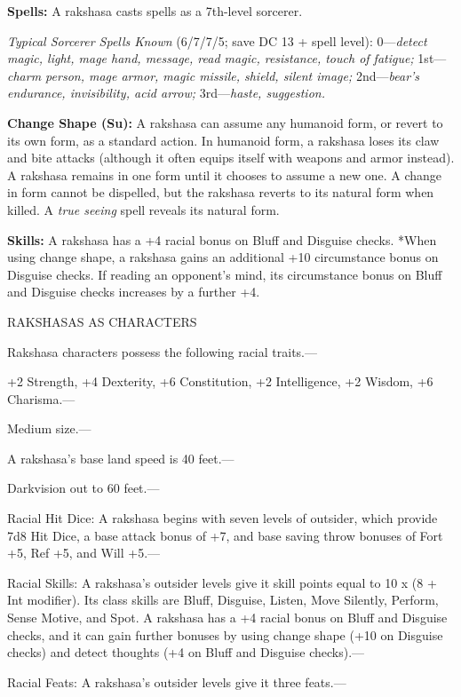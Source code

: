 \documentclass{article}
\begin{document}
\textbf{Spells:} A rakshasa casts spells as a 7th-level sorcerer. 

\textit{Typical Sorcerer Spells Known }(6/7/7/5; save DC 13 + spell level): 0---\textit{detect 
magic, light, mage hand, message, read magic, resistance, touch of fatigue; }1st---\textit{charm 
person, mage armor, magic missile, shield, silent image; }2nd---\textit{bear's 
endurance, invisibility, acid arrow; }3rd---\textit{haste, suggestion.}

\textbf{Change Shape (Su):} A rakshasa can assume any humanoid form, or revert 
to its own form, as a standard action. In humanoid form, a rakshasa loses its claw 
and bite attacks (although it often equips itself with weapons and armor instead). 
A rakshasa remains in one form until it chooses to assume a new one. A change in 
form cannot be dispelled, but the rakshasa reverts to its natural form when killed. 
A \textit{true seeing }spell reveals its natural form.

\textbf{Skills:} A rakshasa has a +4 racial bonus on Bluff and Disguise checks. 
*When using change shape, a rakshasa gains an additional +10 circumstance bonus 
on Disguise checks. If reading an opponent's mind, its circumstance bonus on Bluff 
and Disguise checks increases by a further +4.

RAKSHASAS AS CHARACTERS

Rakshasa characters possess the following racial traits.--- 

\parindent=3pt
+2 Strength, +4 Dexterity, +6 Constitution, +2 Intelligence, +2 Wisdom, +6 Charisma.---

\parindent=0pt
Medium size.---

A rakshasa's base land speed is 40 feet.---

Darkvision out to 60 feet.---

Racial Hit Dice: A rakshasa begins with seven levels of outsider, which provide 
7d8 Hit Dice, a base attack bonus of +7, and base saving throw bonuses of Fort 
+5, Ref +5, and Will +5.---

Racial Skills: A rakshasa's outsider levels give it skill points equal to 10 x 
(8 + Int modifier). Its class skills are Bluff, Disguise, Listen, Move Silently, 
Perform, Sense Motive, and Spot. A rakshasa has a +4 racial bonus on Bluff and 
Disguise checks, and it can gain further bonuses by using change shape (+10 on 
Disguise checks) and detect thoughts (+4 on Bluff and Disguise checks).---

Racial Feats: A rakshasa's outsider levels give it three feats.--- 
\end{document}
